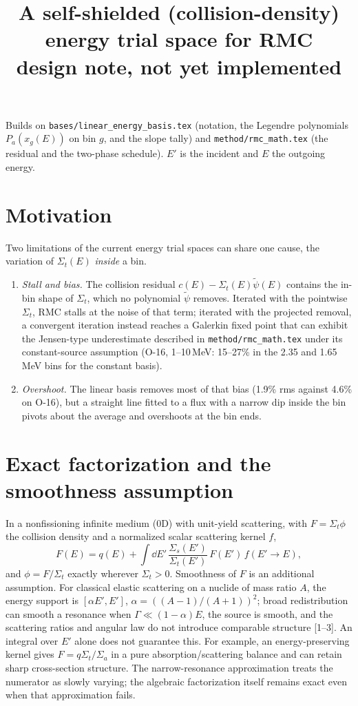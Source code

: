 \documentclass[11pt]{article}
\title{A self-shielded (collision-density) energy trial space for RMC\\
\large design note, not yet implemented}
\date{}
\newcommand{\tpsi}{\tilde\psi}
\newcommand{\Sigt}{\Sigma_t}
\begin{document}
\maketitle

\noindent Builds on \texttt{bases/linear\_energy\_basis.tex} (notation, the Legendre
polynomials $P_a(x_g(E))$ on bin $g$, and the slope tally) and \texttt{method/rmc\_math.tex}
(the residual and the two-phase schedule). $E'$ is the incident and $E$ the outgoing
energy.

\section{Motivation}

Two limitations of the current energy trial spaces can share one cause, the variation of
$\Sigt(E)$ \emph{inside} a bin.
\begin{enumerate}
  \item \emph{Stall and bias.} The collision residual $c(E) - \Sigt(E)\tpsi(E)$
  contains the in-bin shape of $\Sigt$, which no polynomial $\tpsi$ removes. Iterated
  with the pointwise $\Sigt$, RMC stalls at the noise of that term; iterated with the
  projected removal, a convergent iteration instead reaches a Galerkin fixed point
  that can exhibit the Jensen-type underestimate described in \texttt{method/rmc\_math.tex}
  under its constant-source assumption (O-16, 1--10\,MeV: 15--27\%
  in the 2.35 and 1.65\,MeV bins for the constant basis).
  \item \emph{Overshoot.} The linear basis removes most of that bias (1.9\% rms against
  4.6\% on O-16), but a straight line fitted to a flux with a narrow dip inside the bin
  pivots about the average and overshoots at the bin ends.
\end{enumerate}

\section{Exact factorization and the smoothness assumption}

In a nonfissioning infinite medium (0D) with unit-yield scattering, with
$F=\Sigt\phi$ the collision density and a normalized scalar scattering kernel $f$,
\begin{equation}
  F(E) = q(E) + \int \dd E'\, \frac{\Sigma_s(E')}{\Sigt(E')}\,F(E')\,f(E'\to E),
  \label{eq:collision}
\end{equation}
and $\phi = F/\Sigt$ exactly wherever $\Sigt>0$. Smoothness of $F$ is an additional
assumption. For classical elastic scattering on a nuclide of mass ratio $A$, the
energy support is $[\alpha E',E']$, $\alpha=((A-1)/(A+1))^2$; broad redistribution
can smooth a resonance when $\Gamma\ll(1-\alpha)E$, the source is smooth, and the
scattering ratios and angular law do not introduce comparable structure [1--3].
An integral over $E'$ alone does not guarantee this. For example, an
energy-preserving kernel gives $F=q\Sigt/\Sigma_a$ in a pure absorption/scattering
balance and can retain sharp cross-section structure.
The narrow-resonance approximation treats the numerator as slowly varying;
the algebraic factorization itself remains exact even when that approximation fails.
\end{document}
